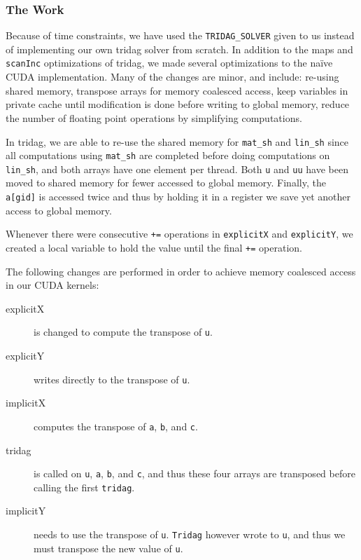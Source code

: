 \documentclass[12pt, oneside]{article}
\begin{document}
\subsubsection{The Work}
Because of time constraints, we have used the \texttt{TRIDAG\_SOLVER} given to us instead of implementing our own tridag solver from scratch.
In addition to the maps and \texttt{scanInc} optimizations of tridag, we made several optimizations to the na\"ive CUDA implementation. Many of the changes are minor, and include: re-using shared memory, transpose arrays for memory coalesced access, keep variables in private cache until modification is done before writing to global memory, reduce the number of floating point operations by simplifying computations.

In tridag, we are able to re-use the shared memory for  \texttt{mat\_sh} and \texttt{lin\_sh} since all computations using \texttt{mat\_sh} are completed before doing computations on \texttt{lin\_sh}, and both arrays have one element per thread. Both \texttt{u} and \texttt{uu} have been moved to shared memory for fewer accessed to global memory. Finally, the \texttt{a[gid]} is accessed twice and thus by holding it in a register we save yet another access to global memory.

Whenever there were consecutive \texttt{+=} operations in \texttt{explicitX} and \texttt{explicitY}, we created a local variable to hold the value until the final \texttt{+=} operation.

The following changes are performed in order to achieve memory coalesced access in our CUDA kernels:
\begin{description}
\item[explicitX] is changed to compute the transpose of \texttt{u}.
\item[explicitY] writes directly to the transpose of \texttt{u}.
\item[implicitX] computes the transpose of \texttt{a}, \texttt{b}, and \texttt{c}.
\item[tridag] is called on \texttt{u}, \texttt{a}, \texttt{b}, and \texttt{c}, and thus these four arrays are transposed before calling the first \texttt{tridag}.
\item[implicitY] needs to use the transpose of \texttt{u}. \texttt{Tridag} however wrote to \texttt{u}, and thus we must transpose the new value of \texttt{u}.
\end{description}
\end{document}
